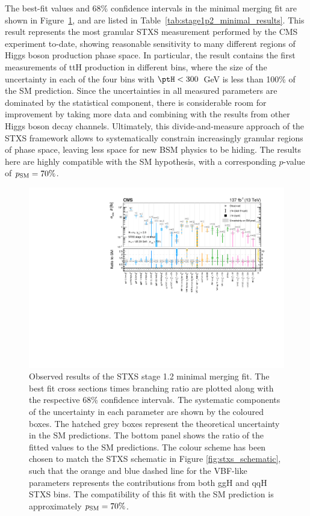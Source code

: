 The \xsbr best-fit values and 68\% confidence intervals in the minimal merging fit are shown in Figure~\ref{fig:stage1p2_minimal_results}, and are listed in Table~\ref{tab:stage1p2_minimal_results}. This result represents the most granular STXS measurement performed by the CMS experiment to-date, showing reasonable sensitivity to many different regions of Higgs boson production phase space. In particular, the result contains the first measurements of ttH production in different bins, where the size of the uncertainty in each of the four bins with $\ptH<300$~GeV is less than 100\% of the SM prediction. Since the uncertainties in all measured parameters are dominated by the statistical component, there is considerable room for improvement by taking more data and combining with the results from other Higgs boson decay channels. Ultimately, this divide-and-measure approach of the STXS framework allows to systematically constrain increasingly granular regions of phase space, leaving less space for new BSM physics to be hiding. The results here are highly compatible with the SM hypothesis, with a corresponding $p$-value of $p_{\rm{SM}}=70\%$.

\begin{figure}[htbp]
  \centering
  \includegraphics[width=1\textwidth]{Figures/hgg_results/stage1p2_minimal_summary.pdf}
  \caption[Results of the STXS stage 1.2 minimal merging fit]
  {
    Observed results of the STXS stage 1.2 minimal merging fit. The best fit cross sections times branching ratio are plotted along with the respective 68\% confidence intervals. The systematic components of the uncertainty in each parameter are shown by the coloured boxes. The hatched grey boxes represent the theoretical uncertainty in the SM predictions. The bottom panel shows the ratio of the fitted values to the SM predictions. The colour scheme has been chosen to match the STXS schematic in Figure \ref{fig:stxs_schematic}, such that the orange and blue dashed line for the VBF-like parameters represents the contributions from both ggH and qqH STXS bins. The compatibility of this fit with the SM prediction is approximately $p_{\rm{SM}}=70\%$. 
  }
  \label{fig:stage1p2_minimal_results}
\end{figure}

